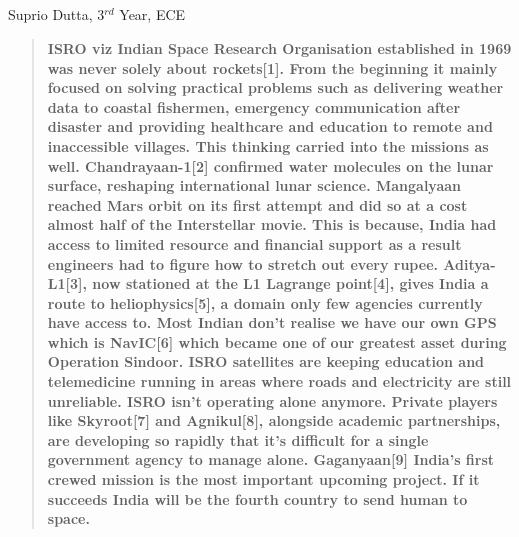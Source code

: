 \begin{center}
  \section{}
  Suprio Dutta, 3$^{rd}$ Year, ECE
\end{center}

\setcounter{figure}{0}

\begingroup
\makeatletter
\renewcommand\subsection{\@startsection{subsection}{2}{\z@}%
  {1.2ex}{0.6ex}{\normalfont\large\bfseries}}
\makeatother
\begin{multicols}{2}
  \begin{abstract}
    \bfseries
    ISRO viz Indian Space Research Organisation established in 1969 was never solely about rockets[1]. From the
    beginning it mainly focused on solving practical problems such as delivering weather data to coastal fishermen,
    emergency communication after disaster and providing healthcare and education to remote and inaccessible
    villages. This thinking carried into the missions as well. Chandrayaan-1[2] confirmed water molecules on the
    lunar surface, reshaping international lunar science. Mangalyaan reached Mars orbit on its first attempt and did
    so at a cost almost half of the Interstellar movie. This is because, India had access to limited resource and financial
    support as a result engineers had to figure how to stretch out every rupee. Aditya-L1[3], now stationed at the L1
    Lagrange point[4], gives India a route to heliophysics[5], a domain only few agencies currently have access to.
    Most Indian don’t realise we have our own GPS which is NavIC[6] which became one of our greatest asset during
    Operation Sindoor. ISRO satellites are keeping education and telemedicine running in areas where roads and
    electricity are still unreliable. ISRO isn’t operating alone anymore. Private players like Skyroot[7] and Agnikul[8],
    alongside academic partnerships, are developing so rapidly that it’s difficult for a single government agency to
    manage alone. Gaganyaan[9] India's first crewed mission is the most important upcoming project. If it succeeds
    India will be the fourth country to send human to space.
  \end{abstract}


\end{multicols}
